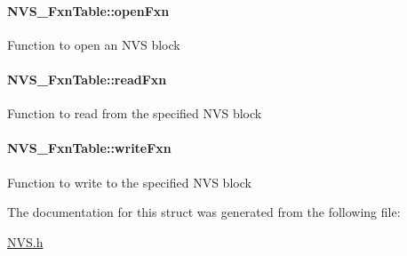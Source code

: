 \paragraph[{open\+Fxn}]{ N\+V\+S\+\_\+\+Fxn\+Table\+::open\+Fxn}\label{struct_n_v_s___fxn_table_a41667ec87600c340a861475f916feb1b}
Function to open an N\+V\+S block 
\paragraph[{read\+Fxn}]{ N\+V\+S\+\_\+\+Fxn\+Table\+::read\+Fxn}\label{struct_n_v_s___fxn_table_a33828cc4c1c845e5a7f95440e79a4e94}
Function to read from the specified N\+V\+S block 
\paragraph[{write\+Fxn}]{ N\+V\+S\+\_\+\+Fxn\+Table\+::write\+Fxn}\label{struct_n_v_s___fxn_table_a67cbdb1f87bf99c91079da45aa0150a3}
Function to write to the specified N\+V\+S block 

The documentation for this struct was generated from the following file\+:\begin{DoxyCompactItemize}
\item 
\hyperlink{_n_v_s_8h}{N\+V\+S.\+h}\end{DoxyCompactItemize}
